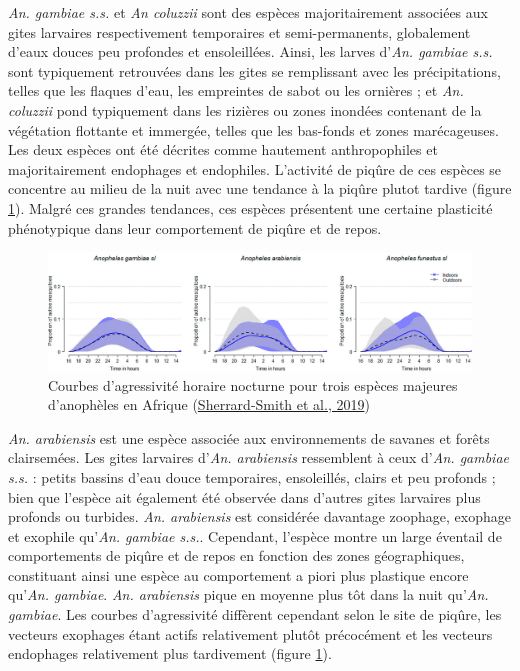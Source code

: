 \documentclass[12pt,twoside]{reedthesis}
\begin{document}
\emph{An. gambiae s.s.} et \emph{An coluzzii} sont des espèces majoritairement associées aux gites larvaires respectivement temporaires et semi-permanents, globalement d'eaux douces peu profondes et ensoleillées. Ainsi, les larves d'\emph{An. gambiae s.s.} sont typiquement retrouvées dans les gites se remplissant avec les précipitations, telles que les flaques d'eau, les empreintes de sabot ou les ornières ; et \emph{An. coluzzii} pond typiquement dans les rizières ou zones inondées contenant de la végétation flottante et immergée, telles que les bas-fonds et zones marécageuses. Les deux espèces ont été décrites comme hautement anthropophiles et majoritairement endophages et endophiles. L'activité de piqûre de ces espèces se concentre au milieu de la nuit avec une tendance à la piqûre plutot tardive (figure \ref{fig:courbes-agressivite-anopheles}). Malgré ces grandes tendances, ces espèces présentent une certaine plasticité phénotypique dans leur comportement de piqûre et de repos.\\
\begin{figure}

{\centering \includegraphics[width=1\linewidth]{figure/courbes_agressivite_vecteurs} 

}

\caption[Courbes d’agressivité horaire nocturne pour trois espèces majeures d'anophèles en Afrique]{Courbes d’agressivité horaire nocturne pour trois espèces majeures d'anophèles en Afrique (\protect\hyperlink{ref-sherrard-smith_mosquito_2019}{Sherrard-Smith et al., 2019})}\label{fig:courbes-agressivite-anopheles}
\end{figure}
\emph{An. arabiensis} est une espèce associée aux environnements de savanes et forêts clairsemées. Les gites larvaires d'\emph{An. arabiensis} ressemblent à ceux d'\emph{An. gambiae s.s.} : petits bassins d'eau douce temporaires, ensoleillés, clairs et peu profonds ; bien que l'espèce ait également été observée dans d'autres gites larvaires plus profonds ou turbides. \emph{An. arabiensis} est considérée davantage zoophage, exophage et exophile qu'\emph{An. gambiae s.s.}. Cependant, l'espèce montre un large éventail de comportements de piqûre et de repos en fonction des zones géographiques, constituant ainsi une espèce au comportement a piori plus plastique encore qu'\emph{An. gambiae}. \emph{An. arabiensis} pique en moyenne plus tôt dans la nuit qu'\emph{An. gambiae}. Les courbes d'agressivité diffèrent cependant selon le site de piqûre, les vecteurs exophages étant actifs relativement plutôt précocément et les vecteurs endophages relativement plus tardivement (figure \ref{fig:courbes-agressivite-anopheles}).\\
\end{document}
